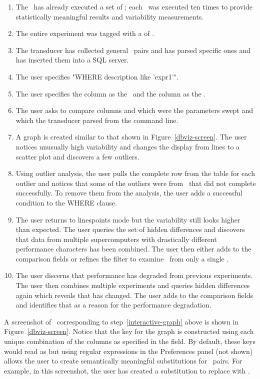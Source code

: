 \begin{enumerate}
\item{The \dispatcher\ has already executed a set of \subs;
each \sub\ was executed ten times to provide
statistically meaningful results and variability measurements.  }
\item{The entire experiment was tagged with a  of .}
\item{The transducer has collected general \kv\ pairs and has parsed specific
ones and has inserted them into a SQL server.}
\item{The user specifies "WHERE description like 'expr1'".}
\item{The user specifies the column  as the \xaxis\ 
and the column  as the \yaxis.}
\item{The user asks to compare columns  and  which
were the parameters swept and which the transducer parsed from the command
line.}
\item{\label{interactive-graph}A graph is created similar to that shown in Figure~\ref{dbviz-screen}.  The user 
notices unusually high variability and changes the display from lines to a 
scatter plot and discovers a few outliers. }
\item{Using outlier analysis,
the user pulls the complete row from the table for each outlier and
notices that some of the outliers were from \subs\ that did not complete
successfully.  To remove them from the analysis, the user adds a
successful \Term{retval} condition to the WHERE clause.}
\item{The user returns to linespoints mode but the variability still looks higher than expected.  The user queries the set of hidden differences and discovers
that data from multiple supercomputers with drastically different performance
characters has been combined.  The user then either adds  to
the comparison fields or refines the filter to examine \subs\ from only a
single \Term{system}.}
\item{The user discerns that performance has degraded from previous 
experiments.  The user then combines multiple experiments and queries 
hidden differences again which reveals that  has changed.
The user adds \Term{osversion} to the comparison fields and identifies that
as a reason for the performance degradation.
}
\end{enumerate}

A screenshot of \dbviz\ corresponding to step~\ref{interactive-graph} above is
shown in Figure~\ref{dbviz-screen}.  Notice that the key for the graph is 
constructed using each unique combination of the columns as specified in the
\Term{compare} field.  By default, these keys would read as 
but using regular expressions in the Preferences panel (not shown) allows the
user to create semantically meaningful substitutions for \kv\ pairs.  For example, in this screenshot, the user has created a substitution to replace  with .


